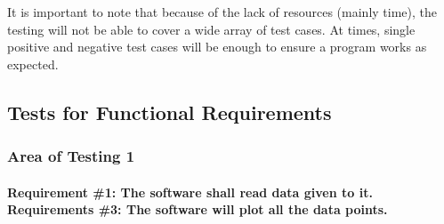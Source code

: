 \documentclass[12pt, titlepage]{article}
\begin{document}
It is important to note that because of the lack of resources (mainly time), the testing will not be able to cover a wide array of test cases. At times, single positive and negative test cases will be enough to ensure a program works as expected. 	
\subsection{Tests for Functional Requirements}

\subsubsection{Area of Testing 1}		
	\label{sec:3.1.1}
	\paragraph{Requirement \#1: The software shall read data given to it. \\ Requirements \#3: The software will plot all the data points.}
\end{document}
